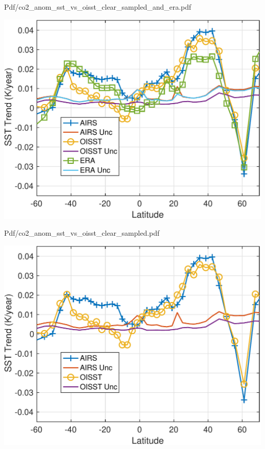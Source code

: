 \documentclass[presentation]{beamer}
\begin{document}
\begin{frame}[label={sec:org6fab763}]{Pdf/co2\_anom\_sst\_vs\_oisst\_clear\_sampled\_and\_era.pdf}
\begin{center}
\includegraphics[width=0.7\linewidth]{./Figs/Pdf/co2_anom_sst_vs_oisst_clear_sampled_and_era.pdf}
\end{center}
\end{frame}

\begin{frame}[label={sec:org0d5ade3}]{Pdf/co2\_anom\_sst\_vs\_oisst\_clear\_sampled.pdf}
\begin{center}
\includegraphics[width=0.7\linewidth]{./Figs/Pdf/co2_anom_sst_vs_oisst_clear_sampled.pdf}
\end{center}
\end{frame}
\end{document}
